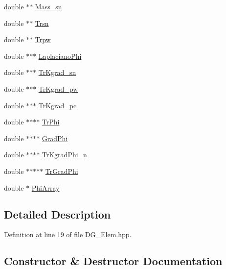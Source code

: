 \begin{DoxyCompactItemize}
double $\ast$$\ast$ \hyperlink{classDG__Elem_a53a6e2f1c4d46714b67f131f44902fc3}{Mass\+\_\+sn}
\item 
double $\ast$$\ast$ \hyperlink{classDG__Elem_a57d06772c710267516e58be078a6635b}{Trsn}
\item 
double $\ast$$\ast$ \hyperlink{classDG__Elem_a77316e95196e96ce7b612334075c8307}{Trpw}
\item 
double $\ast$$\ast$$\ast$ \hyperlink{classDG__Elem_a32939229d5c3e35ef503c432975949cc}{Laplaciano\+Phi}
\item 
double $\ast$$\ast$$\ast$ \hyperlink{classDG__Elem_aa71a1b860606c8560d0ef2a981580340}{Tr\+Kgrad\+\_\+sn}
\item 
double $\ast$$\ast$$\ast$ \hyperlink{classDG__Elem_a9c510976b9964cc09f695b5c1becbc2e}{Tr\+Kgrad\+\_\+pw}
\item 
double $\ast$$\ast$$\ast$ \hyperlink{classDG__Elem_a57dac9aed0b175230089be51335e2dfa}{Tr\+Kgrad\+\_\+pc}
\item 
double $\ast$$\ast$$\ast$$\ast$ \hyperlink{classDG__Elem_ae1432d30cbd7b063fc859a65362ee8bf}{Tr\+Phi}
\item 
double $\ast$$\ast$$\ast$$\ast$ \hyperlink{classDG__Elem_a89a6e65d3cca9d70aff0af308e1c4828}{Grad\+Phi}
\item 
double $\ast$$\ast$$\ast$$\ast$ \hyperlink{classDG__Elem_a2703c18a4eb102761f135b01958110c6}{Tr\+Kgrad\+Phi\+\_\+n}
\item 
double $\ast$$\ast$$\ast$$\ast$$\ast$ \hyperlink{classDG__Elem_acb3ed0d11e27ceae8f0f7c33496aa7e8}{Tr\+Grad\+Phi}
\item 
double $\ast$ \hyperlink{classDG__Elem_a79caff690ab51cd79dabbb5fd110d111}{Phi\+Array}
\end{DoxyCompactItemize}


\subsection{Detailed Description}


Definition at line 19 of file D\+G\+\_\+\+Elem.\+hpp.



\subsection{Constructor \& Destructor Documentation}
\mbox{\label{classDG__Elem_a9f40328ca740050c165ccffe11007d35}} 
